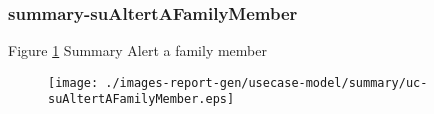 \subsubsection{summary-suAltertAFamilyMember}

\label{RE-use-case-suAltertAFamilyMember}



Figure \ref{fig:lu.uni.lassy.excalibur.g01.specification-RE-UCD-uc-suAltertAFamilyMember}
Summary Alert a family member

\begin{figure}[htbp]
\begin{center}

\texttt{[image: ./images-report-gen/usecase-model/summary/uc-suAltertAFamilyMember.eps]}
\end{center}
\caption[lu.uni.lassy.excalibur.g01.specification Use Case Diagram: uc-suAltertAFamilyMember]{}
\label{fig:lu.uni.lassy.excalibur.g01.specification-RE-UCD-uc-suAltertAFamilyMember}
\end{figure}
\vspace{0.5cm}

